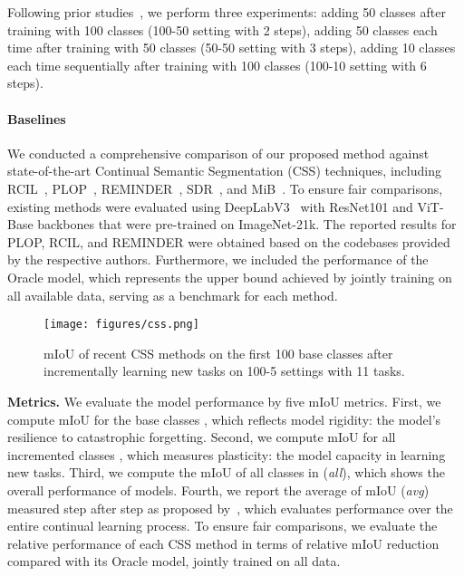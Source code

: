 Following prior studies~\cite{phan2022class,cermelli2020ModelingTB,douillard2021PLOPLW}, we perform three experiments: adding 50 classes after training with 100 classes (100-50 setting with 2 steps), adding 50 classes each time after training with 50 classes (50-50 setting with 3 steps), adding 10 classes each time sequentially after training with 100 classes (100-10 setting with 6 steps).

\paragraph{Baselines} We conducted a comprehensive comparison of our proposed method against state-of-the-art Continual Semantic Segmentation (CSS) techniques, including RCIL~\cite{zhang2022representation}, PLOP~\cite{douillard2021PLOPLW}, REMINDER~\cite{phan2022class}, SDR~\cite{michieli2021ContinualSS}, and MiB~\cite{cermelli2020ModelingTB}.
To ensure fair comparisons, existing methods were evaluated using DeepLabV3~\cite{chen2017rethinking} with ResNet101 and ViT-Base backbones that were pre-trained on ImageNet-21k. The reported results for PLOP, RCIL, and REMINDER were obtained based on the codebases provided by the respective authors. Furthermore, we included the performance of the Oracle model, which represents the upper bound achieved by jointly training on all available data, serving as a benchmark for each method.







\begin{figure}[t]
    \centering
    \texttt{[image: figures/css.png]}
    \caption{mIoU of recent CSS methods on the first 100 base classes after incrementally learning new tasks on 100-5 settings with 11 tasks.}
    \label{fig:css}
\end{figure}

\textbf{Metrics.} We evaluate the model performance by five mIoU metrics.
First, we compute mIoU for the base classes , which reflects model rigidity: the model's resilience to catastrophic forgetting.
Second, we compute mIoU for all incremented classes , which measures plasticity: the model capacity in learning new tasks.
Third, we compute the mIoU of all classes in  (\emph{all}), which shows the overall performance of models. 
Fourth, we report the average of mIoU (\emph{avg}) measured step after step as proposed by~\cite{douillard2021PLOPLW}, which evaluates performance over the entire continual learning process. To ensure fair comparisons, we evaluate the relative performance of each CSS method in terms of relative mIoU reduction compared with its Oracle model, jointly trained on all data. 

